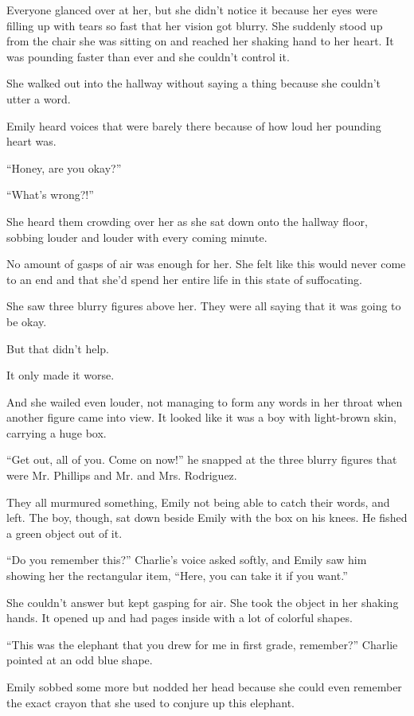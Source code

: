 Everyone glanced over at her, but she didn't notice it because her eyes were filling up with tears so fast that her vision got blurry. She suddenly stood up from the chair she was sitting on and reached her shaking hand to her heart. It was pounding faster than ever and she couldn't control it.

She walked out into the hallway without saying a thing because she couldn't utter a word.

Emily heard voices that were barely there because of how loud her pounding heart was.

“Honey, are you okay?”

“What's wrong?!”

She heard them crowding over her as she sat down onto the hallway floor, sobbing louder and louder with every coming minute.

No amount of gasps of air was enough for her. She felt like this would never come to an end and that she'd spend her entire life in this state of suffocating.

She saw three blurry figures above her. They were all saying that it was going to be okay.

But that didn't help.

It only made it worse.

And she wailed even louder, not managing to form any words in her throat when another figure came into view. It looked like it was a boy with light-brown skin, carrying a huge box.

“Get out, all of you. Come on now!” he snapped at the three blurry figures that were Mr. Phillips and Mr. and Mrs. Rodriguez.

They all murmured something, Emily not being able to catch their words, and left. The boy, though, sat down beside Emily with the box on his knees. He fished a green object out of it.

“Do you remember this?” Charlie's voice asked softly, and Emily saw him showing her the rectangular item, “Here, you can take it if you want.”

She couldn't answer but kept gasping for air. She took the object in her shaking hands. It opened up and had pages inside with a lot of colorful shapes.

“This was the elephant that you drew for me in first grade, remember?” Charlie pointed at an odd blue shape.

Emily sobbed some more but nodded her head because she could even remember the exact crayon that she used to conjure up this elephant.

